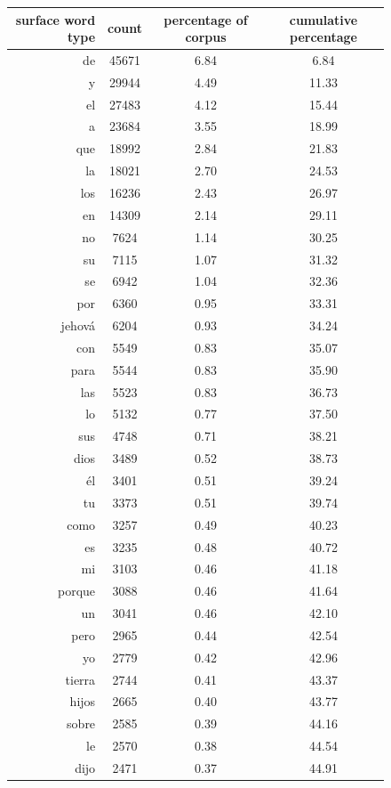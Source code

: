 \begin{figure}
\begin{tiny}
\begin{centering}
\begin{tabular}{|r|c|c|c|}
\hline
surface word type & count & percentage of corpus & cumulative percentage \\
\hline
de & 45671 & 6.84 & 6.84 \\
y & 29944 & 4.49 & 11.33 \\
el & 27483 & 4.12 & 15.44 \\
a & 23684 & 3.55 & 18.99 \\
que & 18992 & 2.84 & 21.83 \\
la & 18021 & 2.70 & 24.53 \\
los & 16236 & 2.43 & 26.97 \\
en & 14309 & 2.14 & 29.11 \\
no & 7624 & 1.14 & 30.25 \\
su & 7115 & 1.07 & 31.32 \\
se & 6942 & 1.04 & 32.36 \\
por & 6360 & 0.95 & 33.31 \\
jehová & 6204 & 0.93 & 34.24 \\
con & 5549 & 0.83 & 35.07 \\
para & 5544 & 0.83 & 35.90 \\
las & 5523 & 0.83 & 36.73 \\
lo & 5132 & 0.77 & 37.50 \\
sus & 4748 & 0.71 & 38.21 \\
dios & 3489 & 0.52 & 38.73 \\
él & 3401 & 0.51 & 39.24 \\
tu & 3373 & 0.51 & 39.74 \\
como & 3257 & 0.49 & 40.23 \\
es & 3235 & 0.48 & 40.72 \\
mi & 3103 & 0.46 & 41.18 \\
porque & 3088 & 0.46 & 41.64 \\
un & 3041 & 0.46 & 42.10 \\
pero & 2965 & 0.44 & 42.54 \\
yo & 2779 & 0.42 & 42.96 \\
tierra & 2744 & 0.41 & 43.37 \\
hijos & 2665 & 0.40 & 43.77 \\
sobre & 2585 & 0.39 & 44.16 \\
le & 2570 & 0.38 & 44.54 \\
dijo & 2471 & 0.37 & 44.91 \\

\end{tabular}
\end{centering}
\end{tiny}
\end{figure}
